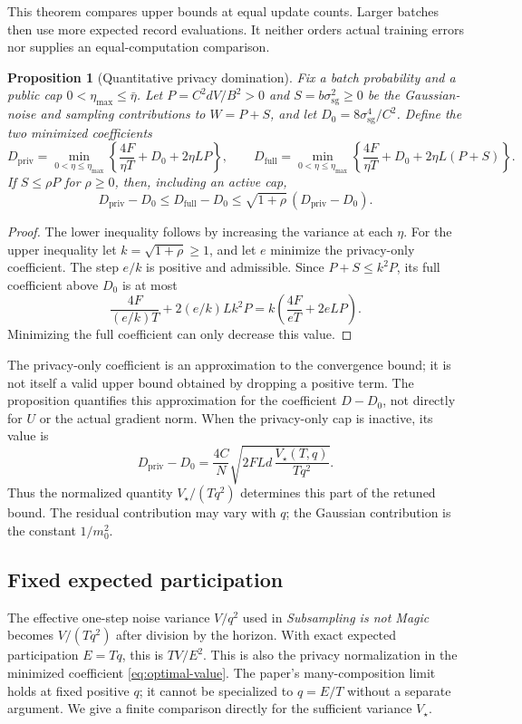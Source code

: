 \documentclass[11pt]{article}
\newtheorem{proposition}[theorem]{Proposition}
\newcommand{\sg}{\mathrm{sg}}
\begin{document}
This theorem compares upper bounds at equal update counts. Larger batches
then use more expected record evaluations. It neither orders actual training
errors nor supplies an equal-computation comparison.

\begin{proposition}[Quantitative privacy domination]\label{prop:dominance}
Fix a batch probability and a public cap $0<\eta_{\max}\le\bar\eta$.
Let $P=C^2dV/B^2>0$ and $S=b\sigma_{\sg}^2\ge0$ be the
Gaussian-noise and sampling contributions to $W=P+S$, and let
$D_0=8\sigma_{\sg}^4/C^2$. Define the two minimized coefficients
\[
 D_{\mathrm{priv}}=\min_{0<\eta\le\eta_{\max}}
     \left\{\frac{4F}{\eta T}+D_0+2\eta LP\right\},\qquad
 D_{\mathrm{full}}=\min_{0<\eta\le\eta_{\max}}
     \left\{\frac{4F}{\eta T}+D_0+2\eta L(P+S)\right\}.
\]
If $S\le\rho P$ for $\rho\ge0$, then, including an active cap,
\[
 D_{\mathrm{priv}}-D_0
 \le D_{\mathrm{full}}-D_0
 \le\sqrt{1+\rho}\,(D_{\mathrm{priv}}-D_0).
\]
\end{proposition}
\begin{proof}
The lower inequality follows by increasing the variance at each $\eta$.
For the upper inequality let $k=\sqrt{1+\rho}\ge1$, and let $e$ minimize
the privacy-only coefficient. The step $e/k$ is positive and admissible.
Since $P+S\le k^2P$, its full coefficient above $D_0$ is at most
\[
 \frac{4F}{(e/k)T}+2(e/k)Lk^2P
 =k\left(\frac{4F}{eT}+2eLP\right).
\]
Minimizing the full coefficient can only decrease this value.
\end{proof}

The privacy-only coefficient is an approximation to the convergence bound;
it is not itself a valid upper bound obtained by dropping a positive term.
The proposition quantifies this approximation for the coefficient $D-D_0$,
not directly for $U$ or the actual gradient norm.
When the privacy-only cap is inactive, its value is
\[
 D_{\mathrm{priv}}-D_0
 =\frac{4C}{N}\sqrt{2FLd\,\frac{V_\star(T,q)}{Tq^2}}.
\]
Thus the normalized quantity $V_\star/(Tq^2)$ determines this part of the
retuned bound. The residual contribution may vary with $q$; the Gaussian
contribution is the constant $1/m_0^2$.

\subsection{Fixed expected participation}
\label{sec:fixed-passes}
The effective one-step noise variance $V/q^2$ used in
\emph{Subsampling is not Magic}~\cite{snm} becomes $V/(Tq^2)$ after division
by the horizon. With exact expected participation $E=Tq$, this is
$TV/E^2$. This is also the privacy normalization in the minimized coefficient
\eqref{eq:optimal-value}. The paper's many-composition limit holds at fixed
positive $q$; it cannot be specialized to $q=E/T$ without a separate argument.
We give a finite comparison directly for the sufficient variance $V_\star$.
\end{document}
